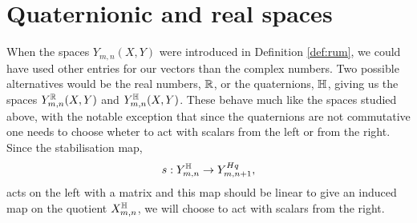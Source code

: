 \section{Quaternionic and real spaces}
\label{sec:koeff}

When the spaces $Y_{m,n}(X,Y)$ were introduced in Definition
\ref{def:rum}, we could have used other entries for our vectors than
the complex numbers. Two possible alternatives would be the real
numbers, $\mathbb{R}$, or the quaternions, $\mathbb{H}$, giving us the spaces
$Y^{\mathbb{R}}_{m,n}(X,Y)$ and $Y^{\mathbb{H}}_{m,n}(X,Y)$. These behave much like
the spaces studied above, with the notable exception that since the
quaternions are not commutative one needs to choose wheter to act with
scalars from the left or from the right. Since the stabilisation map,
\[ s : Y_{m,n}^{\mathbb{H}} \to Y_{m,n+1}^{Hq}, \]
acts on the left with a matrix and this map should be linear to give
an induced map on the quotient $X^{\mathbb{H}}_{m,n}$, we will choose to act
with scalars from the right.




